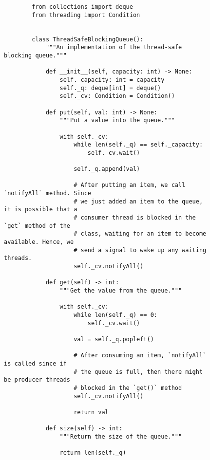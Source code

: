 \begin{figure}[H]
    \centering
    \begin{verbatim}
        from collections import deque
        from threading import Condition


        class ThreadSafeBlockingQueue():
            """An implementation of the thread-safe blocking queue."""

            def __init__(self, capacity: int) -> None:
                self._capacity: int = capacity
                self._q: deque[int] = deque()
                self._cv: Condition = Condition()

            def put(self, val: int) -> None:
                """Put a value into the queue."""

                with self._cv:
                    while len(self._q) == self._capacity:
                        self._cv.wait()

                    self._q.append(val)

                    # After putting an item, we call `notifyAll` method. Since
                    # we just added an item to the queue, it is possible that a
                    # consumer thread is blocked in the `get` method of the
                    # class, waiting for an item to become available. Hence, we
                    # send a signal to wake up any waiting threads.
                    self._cv.notifyAll()

            def get(self) -> int:
                """Get the value from the queue."""

                with self._cv:
                    while len(self._q) == 0:
                        self._cv.wait()

                    val = self._q.popleft()

                    # After consuming an item, `notifyAll` is called since if
                    # the queue is full, then there might be producer threads
                    # blocked in the `get()` method
                    self._cv.notifyAll()

                    return val

            def size(self) -> int:
                """Return the size of the queue."""

                return len(self._q)
    \end{verbatim}
\end{figure}
